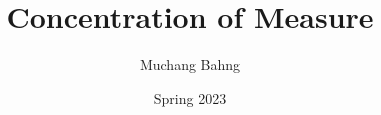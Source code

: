 \documentclass{article}
\begin{document}
\title{Concentration of Measure}
\author{Muchang Bahng}
\date{Spring 2023}

\maketitle
\tableofcontents
\pagebreak







\end{document}

